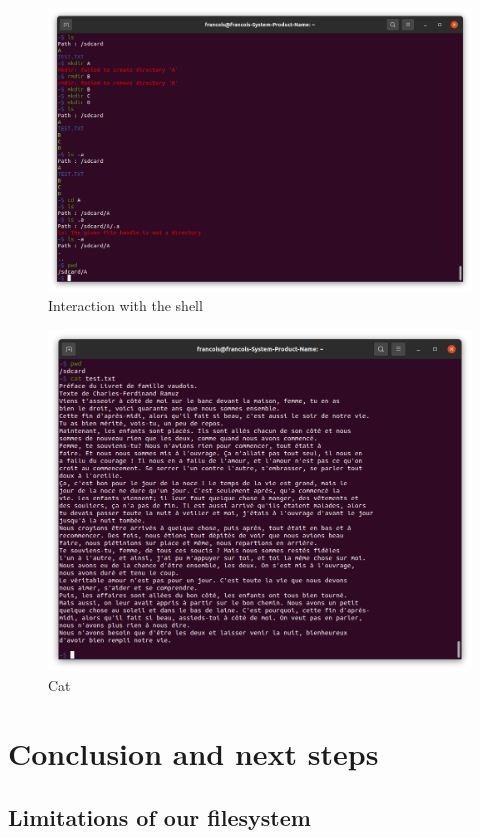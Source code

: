 {\begin{figure}[htp]
    \centering
    \includegraphics[width=12cm]{images/filesystem/interaction_with_shell.png}
    \caption{Interaction with the shell}
    \label{fig:galaxy}
\end{figure}


\begin{figure}[htp]
    \centering
    \includegraphics[width=12cm]{images/filesystem/example_cat.png}
    \caption{Cat}
    \label{fig:galaxy}
\end{figure}


\section{Conclusion and next steps}

\subsection{Limitations of our filesystem}

}

